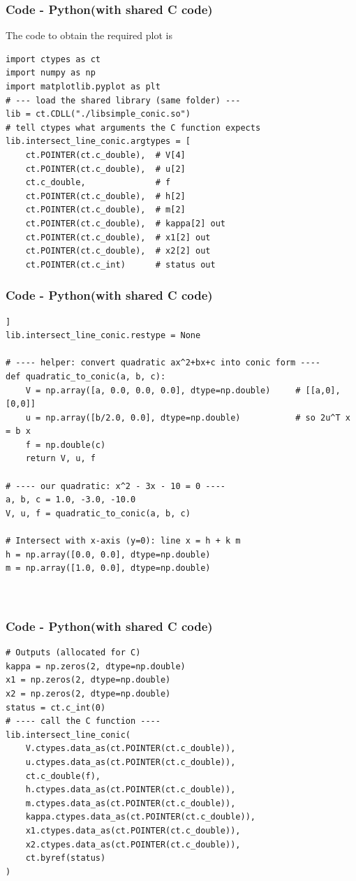 \documentclass{beamer}
\theoremstyle{remark}
\numberwithin{equation}{section}
\begin{document}
\begin{frame}[fragile]
    \frametitle{Code - Python(with shared C code)}
    The code to obtain the required plot is
    \begin{lstlisting}
import ctypes as ct
import numpy as np
import matplotlib.pyplot as plt
# --- load the shared library (same folder) ---
lib = ct.CDLL("./libsimple_conic.so")
# tell ctypes what arguments the C function expects
lib.intersect_line_conic.argtypes = [
    ct.POINTER(ct.c_double),  # V[4]
    ct.POINTER(ct.c_double),  # u[2]
    ct.c_double,              # f
    ct.POINTER(ct.c_double),  # h[2]
    ct.POINTER(ct.c_double),  # m[2]
    ct.POINTER(ct.c_double),  # kappa[2] out
    ct.POINTER(ct.c_double),  # x1[2] out
    ct.POINTER(ct.c_double),  # x2[2] out
    ct.POINTER(ct.c_int)      # status out

\end{lstlisting}
\end{frame}
\begin{frame}[fragile]
\frametitle{Code - Python(with shared C code)}
\begin{lstlisting}
]
lib.intersect_line_conic.restype = None

# ---- helper: convert quadratic ax^2+bx+c into conic form ----
def quadratic_to_conic(a, b, c):
    V = np.array([a, 0.0, 0.0, 0.0], dtype=np.double)     # [[a,0],[0,0]]
    u = np.array([b/2.0, 0.0], dtype=np.double)           # so 2u^T x = b x
    f = np.double(c)
    return V, u, f

# ---- our quadratic: x^2 - 3x - 10 = 0 ----
a, b, c = 1.0, -3.0, -10.0
V, u, f = quadratic_to_conic(a, b, c)

# Intersect with x-axis (y=0): line x = h + k m
h = np.array([0.0, 0.0], dtype=np.double)
m = np.array([1.0, 0.0], dtype=np.double)



\end{lstlisting}
\end{frame}

\begin{frame}[fragile]
\frametitle{Code - Python(with shared C code)}
\begin{lstlisting}
# Outputs (allocated for C)
kappa = np.zeros(2, dtype=np.double)
x1 = np.zeros(2, dtype=np.double)
x2 = np.zeros(2, dtype=np.double)
status = ct.c_int(0)
# ---- call the C function ----
lib.intersect_line_conic(
    V.ctypes.data_as(ct.POINTER(ct.c_double)),
    u.ctypes.data_as(ct.POINTER(ct.c_double)),
    ct.c_double(f),
    h.ctypes.data_as(ct.POINTER(ct.c_double)),
    m.ctypes.data_as(ct.POINTER(ct.c_double)),
    kappa.ctypes.data_as(ct.POINTER(ct.c_double)),
    x1.ctypes.data_as(ct.POINTER(ct.c_double)),
    x2.ctypes.data_as(ct.POINTER(ct.c_double)),
    ct.byref(status)
)


\end{lstlisting}
\end{frame}
\end{document}
